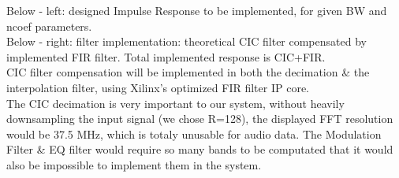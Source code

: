 \documentclass{article}
\begin{document}
Below - left: designed Impulse Response to be implemented,
for given BW and ncoef parameters. \\

Below - right: filter implementation: theoretical
CIC filter compensated by implemented FIR filter.
Total implemented response is CIC+FIR. \\

CIC filter compensation 
will be implemented in both the decimation
\& the interpolation filter, using
Xilinx's optimized FIR filter IP core. \\

The CIC decimation is very important
to our system, without heavily downsampling
the input signal (we chose R=128),
the displayed FFT resolution would be
37.5 MHz, which is totaly unusable for audio data.
The Modulation Filter \& EQ filter would require so 
many bands to be computated that it would also be impossible
to implement them in the system.
\end{document}
